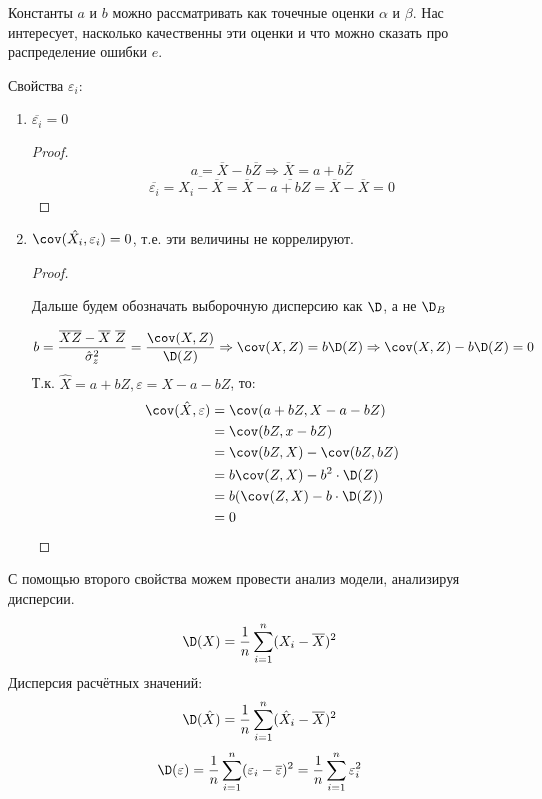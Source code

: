 Константы \(a\) и \(b\) можно рассматривать как точечные оценки \(\alpha\) и \(\beta\). Нас интересует, насколько качественны эти оценки и что можно сказать про распределение ошибки \(e\).

Свойства \(\varepsilon_i\):
\begin{enumerate}
    \item \(\overline{\varepsilon_i} = 0\)
          \begin{proof}
              \[a = \overline{X} - b \overline{Z} \Rightarrow \overline{X} = a + b \overline{Z}\]
              \[\overline{\varepsilon_i} = \overline{X_i - \overline{X}} = \overline{X} - \overline{a + bZ} = \overline{X} - \overline{X} = 0\]
          \end{proof}
    \item \(\cov (\hat{X_i}, \varepsilon_i) = 0\), т.е. эти величины не коррелируют.
          \begin{proof}
              \begin{remark}
                  Дальше будем обозначать выборочную дисперсию как \(\D\), а не \(\D_B\)
              \end{remark}
              \[b = \frac{ \overline{XZ} - \overline{X}\ \overline{Z}}{ \hat{\sigma}_z^2} = \frac{\cov(X, Z)}{\D(Z)} \Rightarrow \cov(X, Z) = b \D(Z) \Rightarrow \cov(X, Z) - b \D(Z) = 0\]
              Т.к. \(\hat{X} = a + b Z, \varepsilon = X - a - bZ\), то:
              \begin{align*}
                  \cov(\hat{X}, \varepsilon) & = \cov(a + bZ, X - a - bZ)       \\
                                             & = \cov(bZ, x - bZ)               \\
                                             & = \cov(bZ, X) - \cov(bZ, bZ)     \\
                                             & = b \cov(Z, X) - b^2 \cdot \D(Z) \\
                                             & = b (\cov(Z, X) - b\cdot \D(Z))  \\
                                             & = 0                              \\
              \end{align*}
          \end{proof}
\end{enumerate}

С помощью второго свойства можем провести анализ модели, анализируя дисперсии.
\begin{notation}
    \[\D(X) = \frac{1}{n} \sum_{i=1}^{n} (X_i - \overline{X})^2\]
    Дисперсия расчётных значений:
    \[\D (\hat{X}) = \frac{1}{n} \sum_{i=1}^{n} ( \hat{X}_i - \overline{X})^2\]
    \[\D(\varepsilon) = \frac{1}{n} \sum_{i=1}^{n} (\varepsilon_i - \overline{\varepsilon})^2 = \frac{1}{n} \sum_{i=1}^{n} \varepsilon_i^2\]
\end{notation}

